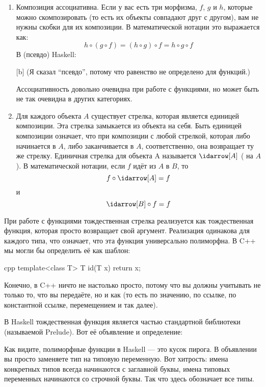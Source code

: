 \begin{enumerate}
  \item
        Композиция ассоциативна. Если у вас есть три морфизма, $f$, $g$ и $h$,
        которые можно скомпозировать (то есть их объекты совпадают друг с другом), вам
        не нужны скобки для их композиции. В математической нотации это
        выражается как:
        \[h \circ (g \circ f) = (h \circ g) \circ f = h \circ g \circ f\]
        В (псевдо) Haskell:

        [b]
        (Я сказал ``псевдо'', потому что равенство не определено для функций.)

        Ассоциативность довольно очевидна при работе с функциями, но может
        быть не так очевидна в других категориях.

  \item
        Для каждого объекта $A$ существует стрелка, которая является единицей композиции.
        Эта стрелка замыкается из объекта на себя. Быть единицей композиции
        означает, что при композиции с любой стрелкой, которая либо начинается в $A$, либо заканчивается
        в $A$, соответственно, она возвращает ту же стрелку. Единичная стрелка для
        объекта A называется $\idarrow[A]$ ( на $A$). В математической
        нотации, если $f$ идёт из $A$ в $B$, то
        \[f \circ \idarrow[A] = f\]
        и
        \[\idarrow[B] \circ f = f\]
\end{enumerate}
При работе с функциями тождественная стрелка реализуется как
тождественная функция, которая просто возвращает свой аргумент.
Реализация одинакова для каждого типа, что означает, что эта функция
универсально полиморфна. В C++ мы могли бы определить её как шаблон:

\begin{snip}{cpp}
template<class T> T id(T x) { return x; }
\end{snip}
Конечно, в C++ ничто не настолько просто, потому что вы должны учитывать
не только то, что вы передаёте, но и как (то есть по значению, по
ссылке, по константной ссылке, перемещением и так далее).

В Haskell тождественная функция является частью стандартной библиотеки
(называемой Prelude). Вот её объявление и определение:

Как видите, полиморфные функции в Haskell --- это кусок пирога. В
объявлении вы просто заменяете тип на типовую переменную. Вот
хитрость: имена конкретных типов всегда начинаются с заглавной буквы,
имена типовых переменных начинаются со строчной буквы. Так что здесь
 обозначает все типы.

